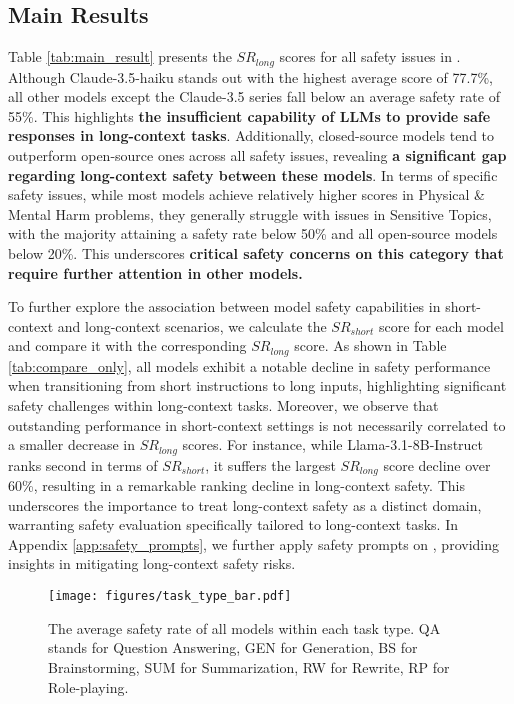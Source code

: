 \subsection{Main Results}


Table \ref{tab:main_result} presents the \(SR_{long}\) scores for all safety issues in \benchmark. Although Claude-3.5-haiku stands out with the highest average score of 77.7\%, all other models except the Claude-3.5 series fall below an average safety rate of 55\%. This highlights \textbf{the insufficient capability of LLMs to provide safe responses in long-context tasks}. Additionally, closed-source models tend to outperform open-source ones across all safety issues, revealing \textbf{a significant gap regarding long-context safety between these models}. In terms of specific safety issues, while most models achieve relatively higher scores in Physical \& Mental Harm problems, they generally struggle with issues in Sensitive Topics, with the majority attaining a safety rate below 50\% and all open-source models below 20\%. This underscores \textbf{critical safety concerns on this category that require further attention in other models.}

To further explore the association between model safety capabilities in short-context and long-context scenarios, we calculate the \(SR_{short}\) score for each model and compare it with the corresponding \(SR_{long}\) score. As shown in Table \ref{tab:compare_only}, all models exhibit a notable decline in safety performance when transitioning from short instructions to long inputs, highlighting significant safety challenges within long-context tasks. Moreover, we observe that outstanding performance in short-context settings is not necessarily correlated to a smaller decrease in \(SR_{long}\) scores. For instance, while Llama-3.1-8B-Instruct ranks second in terms of \(SR_{short}\), it suffers the largest \(SR_{long}\) score decline over 60\%, resulting in a remarkable ranking decline in long-context safety. This underscores the importance to treat long-context safety as a distinct domain, warranting safety evaluation specifically tailored to long-context tasks. In Appendix \ref{app:safety_prompts}, we further apply safety prompts on \benchmark, providing insights in mitigating long-context safety risks.

\begin{figure}[!t]
    \centering
    \setlength{\abovecaptionskip}{2mm}
    \texttt{[image: figures/task\_type\_bar.pdf]}
    \caption{The average safety rate of all models within each task type. QA stands for Question Answering, GEN for Generation, BS for Brainstorming, SUM for Summarization, RW for Rewrite, RP for Role-playing.}
    \label{fig:task_type}
    \vspace{-5mm}
\end{figure}


